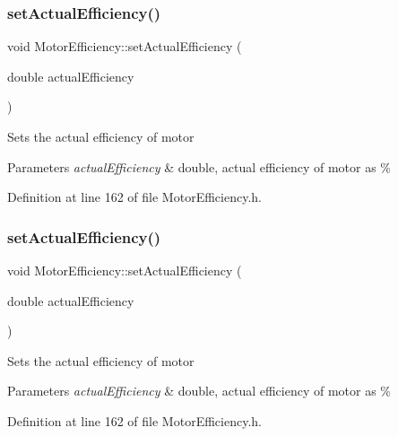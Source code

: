 \subsubsection{\texorpdfstring{set\+Actual\+Efficiency()}{setActualEfficiency()}\hspace{0.1cm}{\footnotesize\ttfamily [1/3]}}
{\footnotesize\ttfamily void Motor\+Efficiency\+::set\+Actual\+Efficiency (\begin{DoxyParamCaption}\item[{double}]{actual\+Efficiency }\end{DoxyParamCaption})\hspace{0.3cm}{\ttfamily [inline]}}

Sets the actual efficiency of motor 
\begin{DoxyParams}{Parameters}
{\em actual\+Efficiency} & double, actual efficiency of motor as \% \\
\hline
\end{DoxyParams}


Definition at line 162 of file Motor\+Efficiency.\+h.

\mbox{\label{class_motor_efficiency_a7a5ad8d01fdc0a3bf93d952752487496}} 
\subsubsection{\texorpdfstring{set\+Actual\+Efficiency()}{setActualEfficiency()}\hspace{0.1cm}{\footnotesize\ttfamily [2/3]}}
{\footnotesize\ttfamily void Motor\+Efficiency\+::set\+Actual\+Efficiency (\begin{DoxyParamCaption}\item[{double}]{actual\+Efficiency }\end{DoxyParamCaption})\hspace{0.3cm}{\ttfamily [inline]}}

Sets the actual efficiency of motor 
\begin{DoxyParams}{Parameters}
{\em actual\+Efficiency} & double, actual efficiency of motor as \% \\
\hline
\end{DoxyParams}


Definition at line 162 of file Motor\+Efficiency.\+h.

